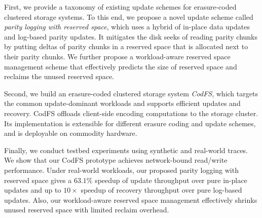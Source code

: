 First, we provide a taxonomy of existing update schemes for
erasure-coded clustered storage systems.  To this end, we propose a novel
update scheme called {\em parity logging with reserved space}, which
uses a hybrid of in-place data updates and log-based parity updates.  It
mitigates the disk seeks of reading parity chunks by putting deltas of parity
chunks in a reserved space that is allocated next to their parity chunks.  We
further propose a workload-aware reserved space management scheme that
effectively predicts the size of reserved space and reclaims the unused
reserved space. 

Second, we build an erasure-coded clustered storage system {\em CodFS}, which
targets the common update-dominant workloads and supports efficient updates
and recovery.   CodFS offloads client-side encoding computations to the
storage cluster.  
Its implementation is extensible for different erasure coding and update
schemes, and is deployable on commodity hardware. 

Finally, we conduct testbed experiments using synthetic and real-world traces.
We show that our CodFS prototype achieves network-bound read/write
performance.  Under real-world workloads, our proposed parity logging with
reserved space gives a ${63.1}\%$ speedup of update throughput over pure
in-place updates and up to ${10\times}$ speedup of recovery throughput over
pure log-based updates.  Also, our workload-aware reserved space management
effectively shrinks unused reserved space with limited reclaim overhead. 




